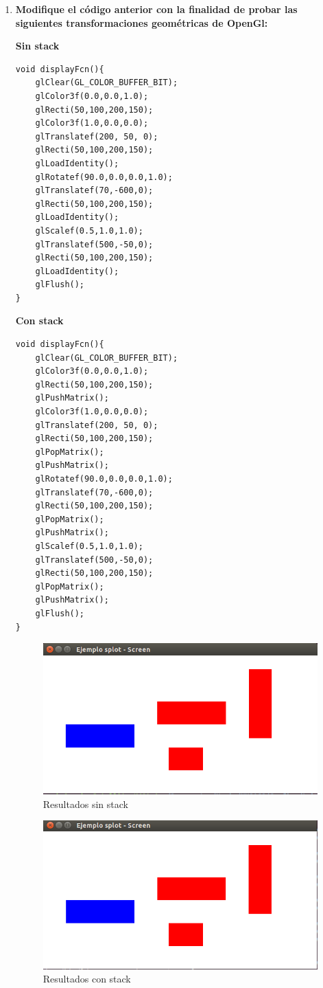 \documentclass[a4paper,12pt]{article}
\begin{document}
\begin{enumerate}
 \item \textbf{Modifique el código anterior con la finalidad de probar las siguientes transformaciones geométricas de OpenGl:}
 
 \textbf{Sin stack}
 
 \begin{lstlisting}
void displayFcn(){
	glClear(GL_COLOR_BUFFER_BIT);
	glColor3f(0.0,0.0,1.0);
	glRecti(50,100,200,150);
	glColor3f(1.0,0.0,0.0);
	glTranslatef(200, 50, 0);
	glRecti(50,100,200,150);
	glLoadIdentity();
	glRotatef(90.0,0.0,0.0,1.0);
	glTranslatef(70,-600,0);
	glRecti(50,100,200,150);
	glLoadIdentity();
	glScalef(0.5,1.0,1.0);
	glTranslatef(500,-50,0);
	glRecti(50,100,200,150);
	glLoadIdentity();
	glFlush();
}
 \end{lstlisting}

 \textbf{Con stack}
 
 \begin{lstlisting}
void displayFcn(){
	glClear(GL_COLOR_BUFFER_BIT);
	glColor3f(0.0,0.0,1.0);
	glRecti(50,100,200,150);
	glPushMatrix();
	glColor3f(1.0,0.0,0.0);
	glTranslatef(200, 50, 0);
	glRecti(50,100,200,150);
	glPopMatrix();
	glPushMatrix();
	glRotatef(90.0,0.0,0.0,1.0);
	glTranslatef(70,-600,0);
	glRecti(50,100,200,150);
	glPopMatrix();
	glPushMatrix();
	glScalef(0.5,1.0,1.0);
	glTranslatef(500,-50,0);
	glRecti(50,100,200,150);
	glPopMatrix();
	glPushMatrix();
	glFlush();
}
 \end{lstlisting}

 \begin{figure}[H]
  \centering
  \includegraphics[scale = 0.5]{2.png}
  \caption{Resultados sin stack}
 \end{figure}
 \begin{figure}[H]
  \centering
  \includegraphics[scale = 0.5]{3.png}
  \caption{Resultados con stack}
 \end{figure}


\end{enumerate}
\end{document}
